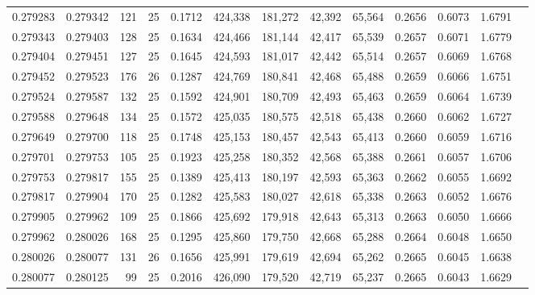 \begin{tabular}{rrrrrrrrrrrrr}
0.279283 & 0.279342 &   121 &  25 &                                     0.1712 & 424,338 & 181,272 &  42,392 &  65,564 & 0.2656 & 0.6073 & 1.6791 \\
0.279343 & 0.279403 &   128 &  25 &                                     0.1634 & 424,466 & 181,144 &  42,417 &  65,539 & 0.2657 & 0.6071 & 1.6779 \\
0.279404 & 0.279451 &   127 &  25 &                                     0.1645 & 424,593 & 181,017 &  42,442 &  65,514 & 0.2657 & 0.6069 & 1.6768 \\
0.279452 & 0.279523 &   176 &  26 &                                     0.1287 & 424,769 & 180,841 &  42,468 &  65,488 & 0.2659 & 0.6066 & 1.6751 \\
0.279524 & 0.279587 &   132 &  25 &                                     0.1592 & 424,901 & 180,709 &  42,493 &  65,463 & 0.2659 & 0.6064 & 1.6739 \\
0.279588 & 0.279648 &   134 &  25 &                                     0.1572 & 425,035 & 180,575 &  42,518 &  65,438 & 0.2660 & 0.6062 & 1.6727 \\
0.279649 & 0.279700 &   118 &  25 &                                     0.1748 & 425,153 & 180,457 &  42,543 &  65,413 & 0.2660 & 0.6059 & 1.6716 \\
0.279701 & 0.279753 &   105 &  25 &                                     0.1923 & 425,258 & 180,352 &  42,568 &  65,388 & 0.2661 & 0.6057 & 1.6706 \\
0.279753 & 0.279817 &   155 &  25 &                                     0.1389 & 425,413 & 180,197 &  42,593 &  65,363 & 0.2662 & 0.6055 & 1.6692 \\
0.279817 & 0.279904 &   170 &  25 &                                     0.1282 & 425,583 & 180,027 &  42,618 &  65,338 & 0.2663 & 0.6052 & 1.6676 \\
0.279905 & 0.279962 &   109 &  25 &                                     0.1866 & 425,692 & 179,918 &  42,643 &  65,313 & 0.2663 & 0.6050 & 1.6666 \\
0.279962 & 0.280026 &   168 &  25 &                                     0.1295 & 425,860 & 179,750 &  42,668 &  65,288 & 0.2664 & 0.6048 & 1.6650 \\
0.280026 & 0.280077 &   131 &  26 &                                     0.1656 & 425,991 & 179,619 &  42,694 &  65,262 & 0.2665 & 0.6045 & 1.6638 \\
0.280077 & 0.280125 &    99 &  25 &                                     0.2016 & 426,090 & 179,520 &  42,719 &  65,237 & 0.2665 & 0.6043 & 1.6629 \\

\end{tabular}
